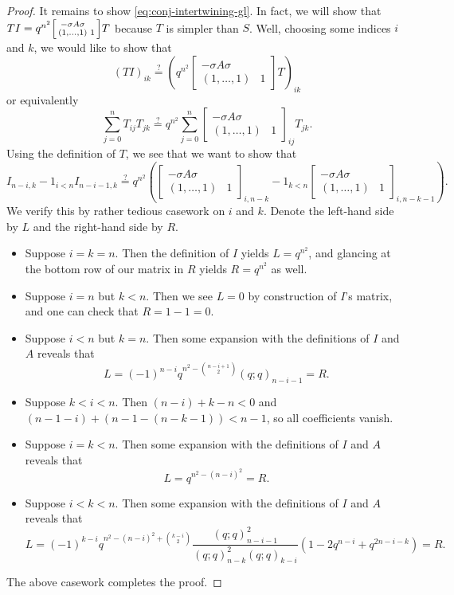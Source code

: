 \begin{proof}
    It remains to show \eqref{eq:conj-intertwining-gl}. In fact, we will show that $TI=q^{n^2}\begin{bsmallmatrix}
        -\sigma A\sigma \\ (1,\ldots,1) & 1
    \end{bsmallmatrix}T$ because $T$ is simpler than $S$. Well, choosing some indices $i$ and $k$, we would like to show that
    \[(TI)_{ik}\stackrel?=\left(q^{n^2}\begin{bmatrix}
        -\sigma A\sigma \\
        (1,\ldots,1) & 1
    \end{bmatrix}T\right)_{ik}\]
    or equivalently
    \[\sum_{j=0}^nT_{ij}T_{jk}\stackrel?=q^{n^2}\sum_{j=0}^n\begin{bmatrix}
        -\sigma A\sigma \\
        (1,\ldots,1) & 1
    \end{bmatrix}_{ij}T_{jk}.\]
    Using the definition of $T$, we see that we want to show that
    \[I_{n-i,k}-1_{i<n}I_{n-i-1,k}\stackrel?=q^{n^2}\left(\begin{bmatrix}
        -\sigma A\sigma \\
        (1,\ldots,1) & 1
    \end{bmatrix}_{i,n-k}-1_{k<n}\begin{bmatrix}
        -\sigma A\sigma \\
        (1,\ldots,1) & 1
    \end{bmatrix}_{i,n-k-1}\right).\]
    We verify this by rather tedious casework on $i$ and $k$. Denote the left-hand side by $L$ and the right-hand side by $R$.
    \begin{itemize}
        \item Suppose $i=k=n$. Then the definition of $I$ yields $L=q^{n^2}$, and glancing at the bottom row of our matrix in $R$ yields $R=q^{n^2}$ as well.
        \item Suppose $i=n$ but $k<n$. Then we see $L=0$ by construction of $I$'s matrix, and one can check that $R=1-1=0$.
        \item Suppose $i<n$ but $k=n$. Then some expansion with the definitions of $I$ and $A$ reveals that
        \[L=(-1)^{n-i}q^{n^2-\binom{n-i+1}2}(q;q)_{n-i-1}=R.\]
        \item Suppose $k<i<n$. Then $(n-i)+k-n<0$ and $(n-1-i)+(n-1-(n-k-1))<n-1$, so all coefficients vanish.
        \item Suppose $i=k<n$. Then some expansion with the definitions of $I$ and $A$ reveals that
        \[L=q^{n^2-(n-i)^2}=R.\]
        \item Suppose $i<k<n$. Then some expansion with the definitions of $I$ and $A$ reveals that
        \[L=(-1)^{k-i}q^{n^2-(n-i)^2+\binom{k-i}2}\frac{(q;q)_{n-i-1}^2}{(q;q)_{n-k}^2(q;q)_{k-i}}\left(1-2q^{n-i}+q^{2n-i-k}\right)=R.\]
    \end{itemize}
    The above casework completes the proof.
\end{proof}

